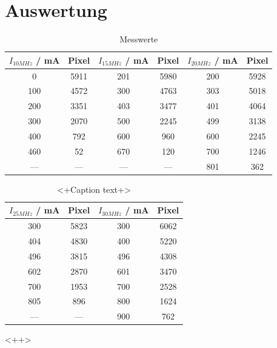 \section{Auswertung}
\label{sec:Auswertung}
\begin{table}
  \centering
  \caption{Messwerte}
  \begin{tabular}{c c|c c|c c}
    \toprule
    	$I_{10 MHz}$ / mA & Pixel & $I_{15MHz}$ / mA & Pixel & $I_{20MHz}$ / mA & Pixel \\    
    \midrule
	0   & 5911 & 201 & 5980 & 200 & 5928 \\
	100 & 4572 & 300 & 4763 & 303 & 5018 \\
	200 & 3351 & 403 & 3477 & 401 & 4064 \\
	300 & 2070 & 500 & 2245 & 499 & 3138 \\
	400 & 792  & 600 & 960  & 600 & 2245 \\
	460 & 52   & 670 & 120  & 700 & 1246 \\
	--- & ---  & --- & ---  & 801 & 362  \\
    \bottomrule 
  \end{tabular}
  \label{tab:<+label+>}
\end{table}

\begin{table}
  \centering
  \caption{<+Caption text+>}
  \begin{tabular}{c c|c c}
    \toprule
 	$I_{25MHz}$ / mA & Pixel & $I_{30MHz}$ / mA & Pixel \\
    \midrule
	300 & 5823 & 300 & 6062 \\
	404 & 4830 & 400 & 5220 \\
	496 & 3815 & 496 & 4308 \\
	602 & 2870 & 601 & 3470 \\
	700 & 1953 & 700 & 2528 \\
	805 & 896  & 800 & 1624 \\
	--- & ---  & 900 & 762  \\
    \bottomrule
  \end{tabular}
  \label{tab:<+label+>}
\end{table}<++>

